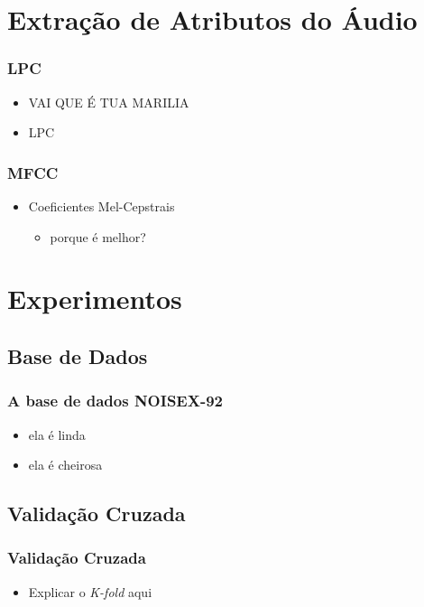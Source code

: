 \documentclass{beamer}
\begin{document}
\section{Extração de Atributos do Áudio}
  		
\begin{frame}
  	\frametitle{LPC}
  	\begin{itemize}
  		\setlength\itemsep{1em}
  		\item VAI QUE É TUA MARILIA
  		\item LPC
  	\end{itemize}
\end{frame}


\begin{frame}
  	\frametitle{MFCC}
  	\begin{itemize}
  		\setlength\itemsep{1em}
  		\item Coeficientes Mel-Cepstrais
  		\begin{itemize}
  			\item porque é melhor?
  		\end{itemize}
  	\end{itemize}
\end{frame}

\section{Experimentos}

\subsection{Base de Dados}

\begin{frame}
    \frametitle{A base de dados NOISEX-92}
    
    \begin{itemize}
    	\setlength\itemsep{1em}
        \item ela é linda
    	\item ela é cheirosa
	\end{itemize}
    
\end{frame}

\subsection{Validação Cruzada}

\begin{frame}
	\frametitle{Validação Cruzada}
	
	\begin{itemize}
		\item Explicar o \textit{K-fold} aqui
	\end{itemize}
\end{frame}
\end{document}
